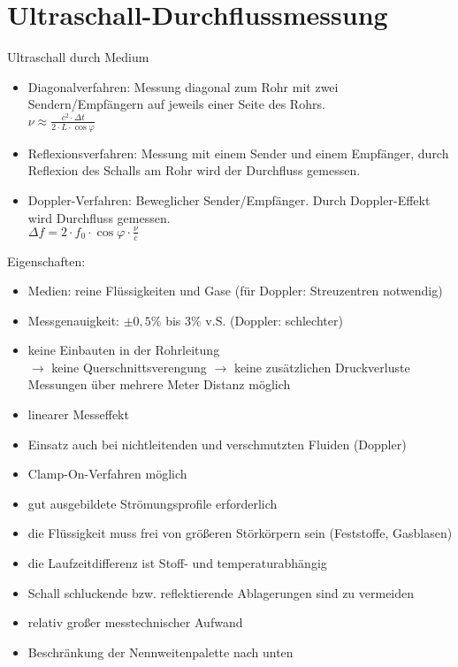 \documentclass{scrreprt}
\begin{document}
\section{Ultraschall-Durchflussmessung}
Ultraschall durch Medium
\begin{itemize}
\item Diagonalverfahren: Messung diagonal zum Rohr mit zwei Sendern/Empfängern auf jeweils einer Seite des Rohrs.\\
 $\nu \approx \frac{c^2 \cdot \Delta t}{2 \cdot L \cdot \cos \varphi}$
\item Reflexionsverfahren: Messung mit einem Sender und einem Empfänger, durch Reflexion des Schalls am Rohr wird der Durchfluss gemessen.
\item Doppler-Verfahren: Beweglicher Sender/Empfänger. Durch Doppler-Effekt wird Durchfluss gemessen.\\
$\Delta f = 2 \cdot f_0 \cdot \cos \varphi \cdot \frac{\nu}{c}$
\end{itemize}
Eigenschaften:
\begin{itemize}
\item Medien: reine Flüssigkeiten und Gase (für Doppler: Streuzentren notwendig)
\item Messgenauigkeit: $\pm 0,5\%$ bis $3 \%$ v.S. (Doppler: schlechter)
\end{itemize}
\begin{itemize}[label=$+$]
\item keine Einbauten in der Rohrleitung\\
$\to$ keine Querschnittsverengung $\to$ keine zusätzlichen Druckverluste\\
Messungen über mehrere Meter Distanz möglich
\item linearer Messeffekt
\item Einsatz auch bei nichtleitenden und verschmutzten Fluiden (Doppler)
\item Clamp-On-Verfahren möglich
\end{itemize}
\begin{itemize}[label=$-$]
\item gut ausgebildete Strömungsprofile erforderlich
\item die Flüssigkeit muss frei von größeren Störkörpern sein (Feststoffe, Gasblasen)
\item die Laufzeitdifferenz ist Stoff- und temperaturabhängig
\item Schall schluckende bzw. reflektierende Ablagerungen sind zu vermeiden
\item relativ großer messtechnischer Aufwand
\item Beschränkung der Nennweitenpalette nach unten
\end{itemize}
\end{document}

